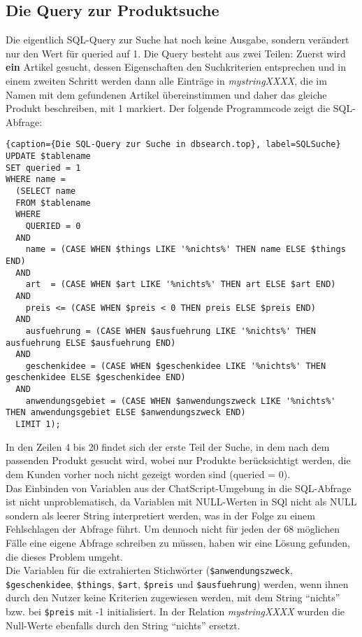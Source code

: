 \subsection{Die Query zur Produktsuche}
\label{sec:Produktsuche}
Die eigentlich SQL-Query zur Suche hat noch keine Ausgabe, sondern verändert nur den Wert für queried auf 1. Die Query besteht aus zwei Teilen: Zuerst wird \textbf{ein} Artikel gesucht, dessen Eigenschaften den Suchkriterien entsprechen und in einem zweiten Schritt werden dann alle Einträge in \textit{mystringXXXX}, die im Namen mit dem gefundenen Artikel übereinstimmen und daher das gleiche Produkt beschreiben, mit 1 markiert. Der folgende Programmcode zeigt die SQL-Abfrage:\\
\begin{lstlisting}{caption={Die SQL-Query zur Suche in dbsearch.top}, label=SQLSuche}
UPDATE $tablename
SET queried = 1
WHERE name =
  (SELECT name
  FROM $tablename
  WHERE
    QUERIED = 0
  AND
    name = (CASE WHEN $things LIKE '%nichts%' THEN name ELSE $things END)
  AND
    art  = (CASE WHEN $art LIKE '%nichts%' THEN art ELSE $art END)
  AND
    preis <= (CASE WHEN $preis < 0 THEN preis ELSE $preis END)
  AND
    ausfuehrung = (CASE WHEN $ausfuehrung LIKE '%nichts%' THEN ausfuehrung ELSE $ausfuehrung END)
  AND
    geschenkidee = (CASE WHEN $geschenkidee LIKE '%nichts%' THEN geschenkidee ELSE $geschenkidee END)
  AND
    anwendungsgebiet = (CASE WHEN $anwendungszweck LIKE '%nichts%' THEN anwendungsgebiet ELSE $anwendungszweck END)
  LIMIT 1); 
\end{lstlisting}
In den Zeilen 4 bis 20 findet sich der erste Teil der Suche, in dem nach dem passenden Produkt gesucht wird, wobei nur Produkte berücksichtigt werden, die dem Kunden vorher noch nicht gezeigt worden sind (queried = 0).\\
Das Einbinden von Variablen aus der ChatScript-Umgebung in die SQL-Abfrage ist nicht unproblematisch, da Variablen mit NULL-Werten in SQl nicht als NULL sondern als leerer String interpretiert werden, was in der Folge zu einem Fehlschlagen der Abfrage führt. Um dennoch nicht für jeden der 68 möglichen Fälle eine eigene Abfrage schreiben zu müssen, haben wir eine Lösung gefunden, die dieses Problem umgeht.\\
Die Variablen für die extrahierten Stichwörter (\lstinline|$anwendungszweck|, \lstinline|$geschenkidee|, \lstinline|$things|, \lstinline|$art|, \lstinline|$preis| und \lstinline|$ausfuehrung|) werden, wenn ihnen durch den Nutzer keine Kriterien zugewiesen werden, mit dem String "`nichts"' bzw. bei \lstinline|$preis| mit -1 initialisiert. In der Relation \textit{mystringXXXX} wurden die Null-Werte ebenfalls durch den String "`nichts"' ersetzt.\\ 
